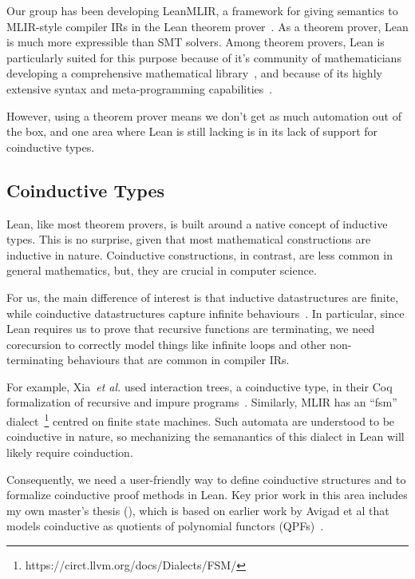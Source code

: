 \documentclass[a4paper]{scrartcl}
\newcommand*{\etal}{~\emph{et al.}}
\begin{document}
Our group has been developing
LeanMLIR, a framework for giving
semantics to MLIR-style compiler IRs in the Lean theorem prover~\cite{demouraLeanTheoremProver2015}. 
As a theorem prover, Lean is
much more expressible than SMT solvers. Among theorem provers, Lean is
particularly suited for this purpose because of it's community of
mathematicians developing a comprehensive mathematical library~\cite{themathlibcommunityLeanMathematicalLibrary2020},
and because of its highly extensive syntax and meta-programming capabilities~\cite{ullrichNotationsHygienicMacro2022, paulinoMetaprogrammingLean}.

However, using a theorem prover means we don't get as much automation
out of the box, and one area where Lean is still lacking is in its lack
of support for coinductive types.


\subsection{Coinductive Types}\label{coinductive-types}

Lean, like most theorem provers, is built around a native concept
of inductive types. This is no surprise, given that most mathematical
constructions are inductive in nature. Coinductive constructions, in
contrast, are less common in general mathematics, but, they are crucial
in computer science.

For us, the main difference of interest is that inductive datastructures
are finite, while coinductive datastructures capture infinite
behaviours~\cite{sangiorgiIntroductionBisimulationCoinduction2011}.
In particular, since Lean requires us to prove that recursive functions are
terminating, we need corecursion to correctly model things like infinite
loops and other non-terminating behaviours that are common in compiler
IRs.

For example, Xia\etal{} used interaction trees, a coinductive type, in
their Coq formalization of recursive and impure programs~\cite{xiaInteractionTreesRepresenting2020}.
Similarly, MLIR has an
``fsm'' dialect~\footnote{https://circt.llvm.org/docs/Dialects/FSM/}
centred on finite state machines. Such automata are understood to be
coinductive in nature, so mechanizing the semanantics of this dialect in
Lean will likely require coinduction.

Consequently, we need a user-friendly way to define coinductive
structures and to formalize coinductive proof methods in Lean. Key prior
work in this area includes my own master's thesis (\cite{keizerImplementingDefinitionalCo}), 
which is based on earlier
work by Avigad et al that models coinductive as quotients of polynomial
functors (QPFs)~\cite{avigadDataTypesQuotients2019}.
\end{document}
